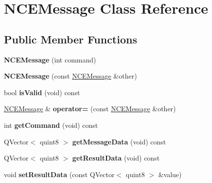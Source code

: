 \hypertarget{class_n_c_e_message}{}\section{N\+C\+E\+Message Class Reference}
\label{class_n_c_e_message}
\subsection*{Public Member Functions}
\begin{DoxyCompactItemize}
\item 
\mbox{\label{class_n_c_e_message_ad46a18e4089cd3dd87e9de8a93f07e8e}} 
{\bfseries N\+C\+E\+Message} (int command)
\item 
\mbox{\label{class_n_c_e_message_a8b2fbd7eeabd6a5e74d8ca93e2dfecee}} 
{\bfseries N\+C\+E\+Message} (const \hyperlink{class_n_c_e_message}{N\+C\+E\+Message} \&other)
\item 
\mbox{\label{class_n_c_e_message_a5c97e5f6738035fb7e5c98ad8624ac35}} 
bool {\bfseries is\+Valid} (void) const
\item 
\mbox{\label{class_n_c_e_message_ad79c0e32f821502c9e9a4343276913b3}} 
\hyperlink{class_n_c_e_message}{N\+C\+E\+Message} \& {\bfseries operator=} (const \hyperlink{class_n_c_e_message}{N\+C\+E\+Message} \&other)
\item 
\mbox{\label{class_n_c_e_message_a5d39e79f97808b4b3657daa3dd848fa0}} 
int {\bfseries get\+Command} (void) const
\item 
\mbox{\label{class_n_c_e_message_a083087542d3d9632098ba3c2e6ff5dde}} 
Q\+Vector$<$ quint8 $>$ {\bfseries get\+Message\+Data} (void) const
\item 
\mbox{\label{class_n_c_e_message_a73f4b0b13af1ee51c59c8b1fa90ca5c7}} 
Q\+Vector$<$ quint8 $>$ {\bfseries get\+Result\+Data} (void) const
\item 
\mbox{\label{class_n_c_e_message_a67f3a24b65151906d4f6d17af1e0242d}} 
void {\bfseries set\+Result\+Data} (const Q\+Vector$<$ quint8 $>$ \&value)

\end{DoxyCompactItemize}
